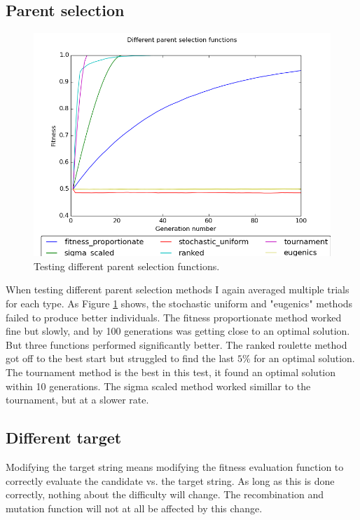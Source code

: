 \subsection*{Parent selection}
\begin{figure}[width=\textwidth]
    \begin{centering}
        \includegraphics[width=\linewidth]{img/different_parent_selection_100N.png}
        \caption{Testing different parent selection functions.}
        \label{different_function}
    \end{centering}
\end{figure}

When testing different parent selection methods I again averaged multiple trials for each type.
As Figure \ref{different_function} shows,
the stochastic uniform and "eugenics" methods failed to produce better individuals.
The fitness proportionate method worked fine but slowly, and by 100 generations was getting close to an optimal solution.
But three functions performed significantly better.
The ranked roulette method got off to the best start but struggled to find the last $5\%$ for an optimal solution.
The tournament method is the best in this test,
it found an optimal solution within 10 generations.
The sigma scaled method worked simillar to the tournament, but at a slower rate.

\subsection*{Different target}
Modifying the target string means modifying the fitness evaluation function to correctly evaluate the candidate vs. the target string.
As long as this is done correctly, nothing about the difficulty will change.
The recombination and mutation function will not at all be affected by this change.


